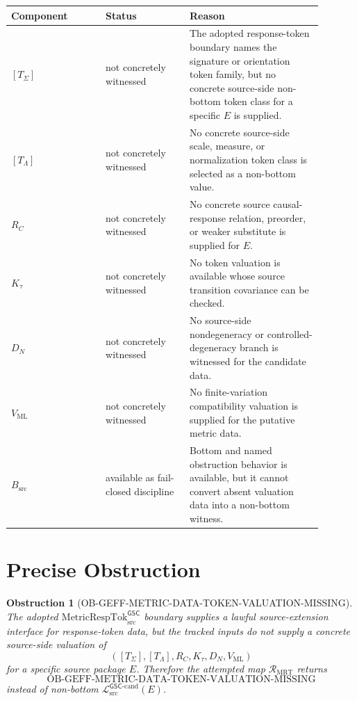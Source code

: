 \documentclass[11pt]{article}
\newcommand{\MetricRespTok}{\mathrm{MetricRespTok}_{\mathrm{src}}^{\mathsf{GSC}}}
\newcommand{\MetricDataCand}{\mathcal{L}_{\mathrm{src}}^{\mathsf{GSC}\mbox{-}\mathrm{cand}}}
\newtheorem{obstruction}{Obstruction}
\begin{document}
\begin{longtable}{p{0.27\linewidth}p{0.24\linewidth}p{0.38\linewidth}}
\toprule
Component & Status & Reason \\
\midrule
\([T_{\Sigma}]\) & not concretely witnessed & The adopted response-token
boundary names the signature or orientation token family, but no concrete
source-side non-bottom token class for a specific \(E\) is supplied. \\
\([T_{\Lambda}]\) & not concretely witnessed & No concrete source-side scale,
measure, or normalization token class is selected as a non-bottom value. \\
\(R_C\) & not concretely witnessed & No concrete source causal-response
relation, preorder, or weaker substitute is supplied for \(E\). \\
\(K_{\tau}\) & not concretely witnessed & No token valuation is available
whose source transition covariance can be checked. \\
\(D_N\) & not concretely witnessed & No source-side nondegeneracy or
controlled-degeneracy branch is witnessed for the candidate data. \\
\(V_{\mathrm{ML}}\) & not concretely witnessed & No finite-variation
compatibility valuation is supplied for the putative metric data. \\
\(B_{\mathrm{src}}\) & available as fail-closed discipline & Bottom and
named obstruction behavior is available, but it cannot convert absent
valuation data into a non-bottom witness. \\
\bottomrule
\end{longtable}

\section{Precise Obstruction}

\begin{obstruction}[OB-GEFF-METRIC-DATA-TOKEN-VALUATION-MISSING]
The adopted \(\MetricRespTok\) boundary supplies a lawful source-extension
interface for response-token data, but the tracked inputs do not supply a
concrete source-side valuation of
\[
  ([T_{\Sigma}], [T_{\Lambda}], R_C, K_{\tau}, D_N, V_{\mathrm{ML}})
\]
for a specific source package \(E\). Therefore the attempted map
\(\mathcal{R}_{\mathrm{MRT}}\) returns
\[
  \mathrm{OB\mbox{-}GEFF\mbox{-}METRIC\mbox{-}DATA\mbox{-}TOKEN\mbox{-}VALUATION\mbox{-}MISSING}
\]
instead of non-bottom \(\MetricDataCand(E)\).
\end{obstruction}
\end{document}
